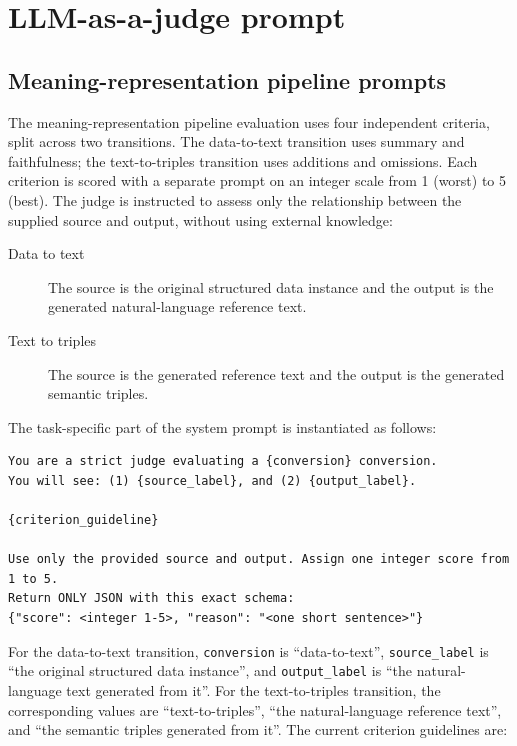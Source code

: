 \section{LLM-as-a-judge prompt}
\label{app:prompt-llm-judge}

\subsection{Meaning-representation pipeline prompts}
\label{app:pipeline-judge-prompts}

The meaning-representation pipeline evaluation uses four independent criteria,
split across two transitions. The data-to-text transition uses summary and
faithfulness; the text-to-triples transition uses additions and omissions. Each
criterion is scored with a separate prompt on an integer scale from 1 (worst)
to 5 (best). The judge is instructed to assess only the relationship between
the supplied source and output, without using external knowledge:

\begin{description}
  \item[Data to text] The source is the original structured data instance and
  the output is the generated natural-language reference text.
  \item[Text to triples] The source is the generated reference text and the
  output is the generated semantic triples.
\end{description}

The task-specific part of the system prompt is instantiated as follows:

\begin{lstlisting}
You are a strict judge evaluating a {conversion} conversion.
You will see: (1) {source_label}, and (2) {output_label}.

{criterion_guideline}

Use only the provided source and output. Assign one integer score from 1 to 5.
Return ONLY JSON with this exact schema:
{"score": <integer 1-5>, "reason": "<one short sentence>"}
\end{lstlisting}

For the data-to-text transition, \texttt{conversion} is ``data-to-text'',
\texttt{source\_label} is ``the original structured data instance'', and
\texttt{output\_label} is ``the natural-language text generated from it''.
For the text-to-triples transition, the corresponding values are
``text-to-triples'', ``the natural-language reference text'', and ``the
semantic triples generated from it''. The current criterion guidelines are:

